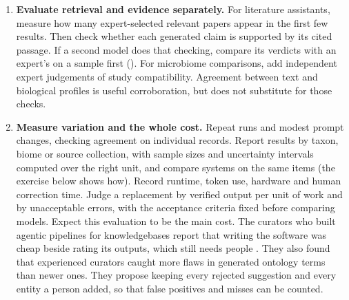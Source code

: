 \begin{enumerate}
    contamination (), since public reference data may be in a
    model's training data. Invented names cannot have been memorised
    \parencite{munch2026phenotypes}, and models know least about the most
    specific ranks \parencite{sun2024taxoglimpse}. Report
    , the proportion of cases receiving an answer, alongside
    accuracy. If confidence controls which answers are accepted, check whether
    higher confidence predicts fewer errors. Measure the errors and
    coverage again at each proposed threshold. A classifier of microbial
    marker-gene sequences shows why. Taxonova reports a genus when it cannot
    resolve the species \parencite{kakabra2026taxonova}. On one dataset of a
    published benchmark it ranked first at its chosen thresholds while leaving
    55.7 per cent of sequences with a known species unassigned; another
    classifier left 5.8 per cent. Its authors therefore also compare
    classifiers at equal coverage.
  \item \textbf{Evaluate retrieval and evidence separately.} For literature
    assistants, measure how many expert-selected relevant papers appear in the
    first few results. Then check whether each generated claim is supported by
    its cited passage. If a second model does that checking, compare its
    verdicts with an expert's on a sample first ().
    For microbiome comparisons, add independent expert
    judgements of study compatibility. Agreement between text and biological
    profiles is useful corroboration, but does not substitute for those checks.
  \item \textbf{Measure variation and the whole cost.} Repeat runs and modest
    prompt changes, checking agreement on individual records. Report results
    by taxon, biome or source collection, with sample sizes and uncertainty
    intervals computed over the right unit, and compare systems on the same
    items (the exercise below shows how). Record runtime, token use, hardware
    and human correction time.
    Judge a replacement by verified output per unit of work and by unacceptable
    errors, with the acceptance criteria fixed before comparing models.
    Expect this evaluation to be the main cost. The curators who built agentic
    pipelines for knowledgebases report that writing the software was cheap
    beside rating its outputs, which still needs people
    \parencite{pombase2026curation}. They also found that experienced
    curators caught more flaws in generated ontology terms than newer ones.
    They propose keeping every rejected suggestion and every entity a person
    added, so that false positives and misses can be counted.
\end{enumerate}

